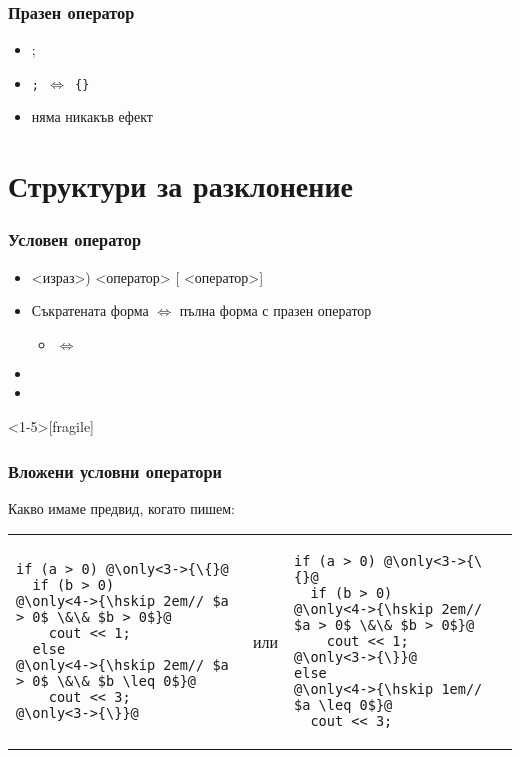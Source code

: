 \documentclass{beamer}
\begin{document}
\begin{frame}
  \frametitle{Празен оператор}
  \begin{itemize}
  \item \tta;
  \item \tt; $\Leftrightarrow$ \tt{\{\}}
  \item няма никакъв ефект
  \end{itemize}
\end{frame}

\section{Структури за разклонение}

\begin{frame}
  \frametitle{Условен оператор}

  \begin{itemize}[<+->]
  \item {}<израз>\tta) <оператор> [ <оператор>]
  \item Съкратената форма $\Leftrightarrow$ пълна форма с празен оператор
    \begin{itemize}
    \item {} $\Leftrightarrow$ 
    \end{itemize}
  \item \exa {}
  \item \exa {}
  \end{itemize}
\end{frame}

\begin{frame}<1-5>[fragile]
  \frametitle{Вложени условни оператори}

  Какво имаме предвид, когато пишем:
  \\[1em]
  \pause
  \begin{tabular}{l@{\hskip 6em}c@{\hskip 4em}l}
\begin{lstlisting}
if (a > 0) @\only<3->{\{}@
  if (b > 0)
@\only<4->{\hskip 2em// $a > 0$ \&\& $b > 0$}@
    cout << 1;
  else
@\only<4->{\hskip 2em// $a > 0$ \&\& $b \leq 0$}@
    cout << 3;
@\only<3->{\}}@
\end{lstlisting}%
    &или&%
\begin{lstlisting}
if (a > 0) @\only<3->{\{}@
  if (b > 0)
@\only<4->{\hskip 2em// $a > 0$ \&\& $b > 0$}@
    cout << 1;
@\only<3->{\}}@
else
@\only<4->{\hskip 1em// $a \leq 0$}@
  cout << 3;
\end{lstlisting}
  \end{tabular}
\end{frame}
\end{document}
